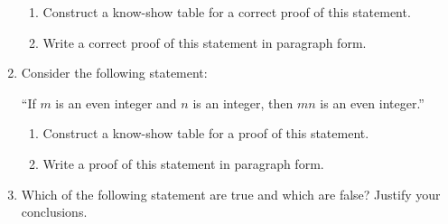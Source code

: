 \documentclass[12pt]{article}
\begin{document}
\begin{enumerate}
\begin{enumerate}
   \item   Construct a know-show table for a correct  proof of this statement.

   \item     Write a  correct proof of this statement in paragraph form.
  \end{enumerate}

\item  Consider the following statement:
  
  ``If $m$ is an even integer and $n$ is an integer, then $mn$ is an even integer.''    

  \begin{enumerate}
   \item   Construct a know-show table for a proof of this statement.

   \item     Write a proof of this statement in paragraph form.
  \end{enumerate}


\item
  Which of the following statement are true and which are false?  Justify your conclusions.
  

\end{enumerate}
\end{document}
